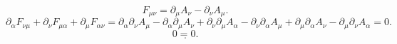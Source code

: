 \documentclass[a4paper]{article}
\title{}
\begin{document}
	\maketitle
\[
F_{\mu\nu}=\partial_\mu A_\nu-\partial_\nu A_\mu
.\] 
\[
\partial_\alpha F_{\nu\mu}+
\partial_\nu F_{\mu\alpha}+
\partial_\mu F_{\alpha\nu}=
\partial_\alpha \partial_\nu A_\mu-
\partial_\alpha\partial_\mu A_\nu+
\partial_\nu\partial_\mu A_\alpha-
\partial_\nu \partial_\alpha A_\mu
+\partial_\mu\partial_\alpha A_\nu-
\partial_\mu \partial_\nu A_\alpha=0
.\] 
\[
0=0
.\] 
\[

.\] 
\end{document}
